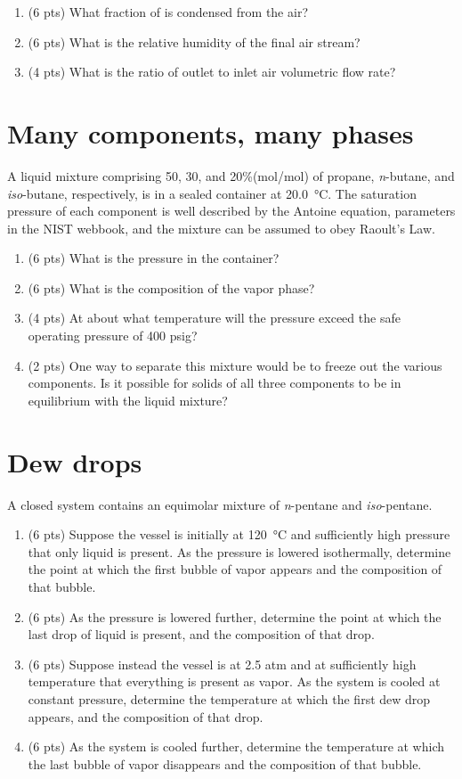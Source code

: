 \documentclass[11pt]{article}
\begin{document}
\begin{enumerate}
\item (6 pts) What fraction of  is condensed from the air?
\item (6 pts) What is the relative humidity of the final air stream?
\item (4 pts) What is the ratio of outlet to inlet air volumetric flow rate?
\end{enumerate}

\section{Many components, many phases}
\label{sec-3}
A liquid mixture comprising 50, 30, and 20\%(mol/mol) of propane, \emph{n}-butane, and \emph{iso}-butane, respectively, is in a sealed container at \SI{20.0}{\celsius}. The saturation pressure of each component is well described by the Antoine equation, parameters in the NIST webbook, and the mixture can be assumed to obey Raoult's Law.

\begin{enumerate}
\item (6 pts) What is the pressure in the container?
\item (6 pts) What is the composition of the vapor phase?
\item (4 pts) At about what temperature will the pressure exceed the safe operating pressure of 400 psig?
\item (2 pts) One way to separate this mixture would be to freeze out the various components.  Is it possible for solids of all three components to be in equilibrium with the liquid mixture?
\end{enumerate}

\section{Dew drops}
\label{sec-4}
A closed system contains an equimolar mixture of \emph{n}-pentane and \emph{iso}-pentane.
\begin{enumerate}
\item (6 pts) Suppose the vessel is initially at \SI{120}{\celsius} and sufficiently  high pressure that only liquid is present.  As the pressure is lowered isothermally, determine the point at which the first bubble of vapor appears and the composition of that bubble.
\item (6 pts) As the pressure is lowered further, determine the point at which the last drop of liquid is present, and the composition of that drop.
\item (6 pts) Suppose instead the vessel is at 2.5 atm and at sufficiently high temperature that everything is present as vapor.  As the system is cooled at constant pressure, determine the temperature at which the first dew drop appears, and the composition of that drop.
\item (6 pts) As the system is cooled further, determine the temperature at which the last bubble of vapor disappears and the composition of that bubble.
\end{enumerate}
\end{document}
